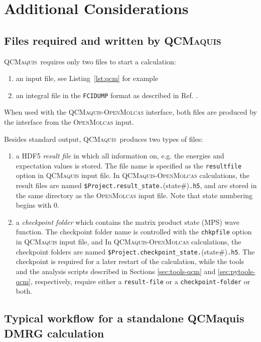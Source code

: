 \documentclass[bibliography=totoc,12pt,a4paper]{scrartcl}
\newcommand{\mol}{\textsc{OpenMolcas}}
\newcommand{\qcm}{\textsc{QCMaquis}}
\newcommand{\kwd}[1]{\texttt{#1}}
\begin{document}
\clearpage
\newpage


\section{Additional Considerations}

\subsection{Files required and written by \qcm}\label{sec:file-req-qcm}

\qcm\ requires only two files to start a calculation:

\begin{enumerate}
 \item an input file, see Listing~\ref{lst:qcm} for example
 \item an integral file in the \texttt{FCIDUMP} format as described in Ref. .
\end{enumerate}

When used with the \qcm{}-\mol{} interface, both files are produced by the interface from the \mol{} input.

Besides standard output, \qcm\ produces two types of files:
\begin{enumerate}
 \item a HDF5 \emph{result file} in which all information on, e.g. the energies and expectation values is stored. The file name is specified as the \kwd{resultfile} option in \qcm{} input file. In \qcm{}-\mol{} calculations, the result files are named \texttt{\$Project.result\_state.}(state\#)\texttt{.h5}, and are stored in the same directory as the \mol{} input file. Note that state numbering begins with 0.
 \item a \emph{checkpoint folder} which contains the matrix product state (MPS) wave function. The checkpoint folder name is controlled with the \kwd{chkpfile} option in \qcm{} input file, and In \qcm{}-\mol{} calculations, the checkpoint folders are named \texttt{\$Project.checkpoint\_state.}(state\#)\texttt{.h5}. The checkpoint is required for a later restart of the calculation, while the tools and the analysis scripts
described in Sections \ref{sec:tools-qcm} and \ref{sec:pytools-qcm}, respectively, require either a \texttt{result-file} or a
\texttt{checkpoint-folder} or both.
\end{enumerate}

\subsection{Typical workflow for a standalone QCMaquis DMRG calculation}
\label{sec:workflow-qcm}
\end{document}

